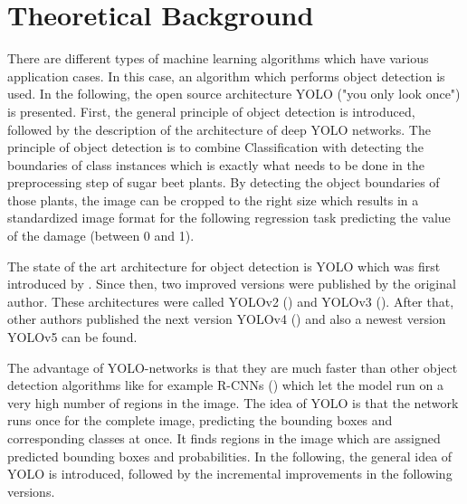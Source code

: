 
\chapter{Theoretical Background}

There are different types of machine learning algorithms which have various application cases. In this case, an algorithm which performs object detection is used. In the following, the open source architecture YOLO ("you only look once") is presented. First, the general principle of object detection is introduced, followed by the description of the architecture of deep YOLO networks. The principle of object detection is to combine Classification with detecting the boundaries of class instances which is exactly what needs to be done in the preprocessing step of sugar beet plants. By detecting the object boundaries of those plants, the image can be cropped to the right size which results in a standardized image format for the following regression task predicting the value of the damage (between 0 and 1).

The state of the art architecture for object detection is YOLO which was first introduced by \cite{yolov1}. Since then, two improved versions were published by the original author. These architectures were called YOLOv2 (\cite{yolov2}) and YOLOv3 (\cite{yolov3}). After that, other authors published the next version YOLOv4 (\cite{yolov4}) and also a newest version YOLOv5 can be found. 

The advantage of YOLO-networks is that they are much faster than other object detection algorithms like for example R-CNNs (\cite{RCNN}) which let the model run on a very high number of regions in the image. The idea of YOLO is that the network runs once for the complete image, predicting the bounding boxes and corresponding classes at once. It finds regions in the image which are assigned predicted bounding boxes and probabilities. In the following, the general idea of YOLO is introduced, followed by the incremental improvements in the following versions. 

